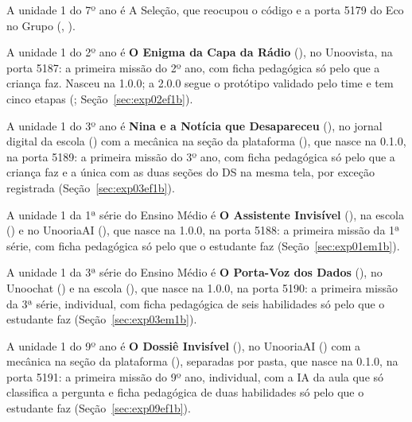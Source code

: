 A unidade 1 do 7º ano é A Seleção, que reocupou o código  e a
porta 5179 do Eco no Grupo (, ).

A unidade 1 do 2º ano é \textbf{O Enigma da Capa da Rádio} (),
no Unoovista, na porta 5187: a primeira missão do 2º ano, com ficha pedagógica só pelo que
a criança faz. Nasceu na 1.0.0; a 2.0.0 segue o protótipo validado pelo time
e tem cinco etapas (; Seção~\ref{sec:exp02ef1b}).

A unidade 1 do 3º ano é \textbf{Nina e a Notícia que Desapareceu}
(), no jornal digital da escola () com a mecânica
na seção da plataforma (), que nasce na 0.1.0, na porta 5189: a
primeira missão do 3º ano, com ficha pedagógica só pelo que a criança faz e
a única com as duas seções do DS na mesma tela, por exceção registrada
(Seção~\ref{sec:exp03ef1b}).

A unidade 1 da 1ª série do Ensino Médio é \textbf{O Assistente Invisível}
(), na escola () e no UnooriaAI (),
que nasce na 1.0.0, na porta 5188: a primeira missão da 1ª série, com ficha
pedagógica só pelo que o estudante faz (Seção~\ref{sec:exp01em1b}).

A unidade 1 da 3ª série do Ensino Médio é \textbf{O Porta-Voz dos Dados}
(), no Unoochat () e na escola (),
que nasce na 1.0.0, na porta 5190: a primeira missão da 3ª série, individual,
com ficha pedagógica de seis habilidades só pelo que o estudante faz
(Seção~\ref{sec:exp03em1b}).

A unidade 1 do 9º ano é \textbf{O Dossiê Invisível} (), no
UnooriaAI () com a mecânica na seção da plataforma
(), separadas por pasta, que nasce na 0.1.0, na porta 5191: a
primeira missão do 9º ano, individual, com a IA da aula que só classifica a
pergunta e ficha pedagógica de duas habilidades só pelo que o estudante faz
(Seção~\ref{sec:exp09ef1b}).

